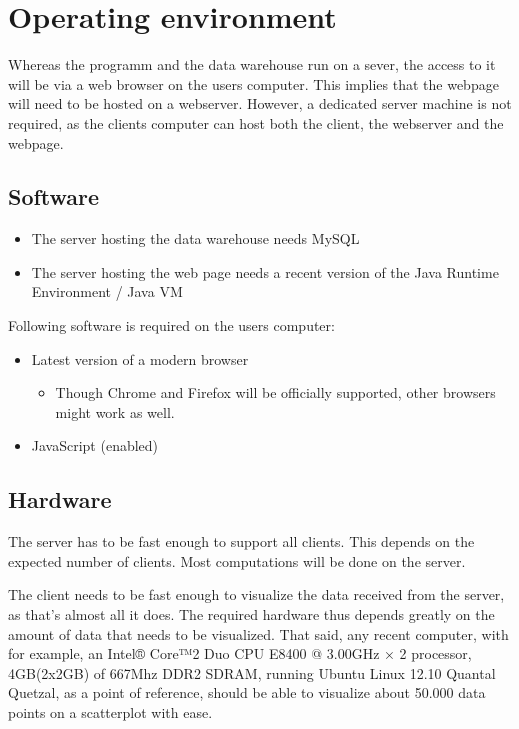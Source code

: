\section{Operating environment}



Whereas the programm and the data warehouse run on a sever,
the access to it will be via a web browser on the users computer. 
This implies that the webpage will need to be hosted on a webserver.
However, a dedicated server machine is not required, as the clients computer can host both the client,
the webserver and the webpage.



\subsection{Software}
\begin{itemize}
  \item The server hosting the data warehouse needs  MySQL %
  
  \item The server hosting the web page needs a 
  recent version of the Java Runtime Environment / Java VM  %
\end{itemize}


Following software is required on the users computer:
\begin{itemize}
  \item Latest version of a modern browser
  \begin{itemize}
    \item Though Chrome and Firefox will be officially supported, other browsers might work as well.
  \end{itemize}
  \item JavaScript (enabled)
\end{itemize}



\subsection{Hardware}

The server has to be fast enough to support all clients. This depends on
the expected number of clients. Most computations will be done on the server.

The client needs to be fast enough to visualize the data received from the server, as that's almost all it does.
The required hardware thus depends greatly on the amount of data that needs to be 
visualized. That said, any recent computer, with for example, 
an Intel® Core™2 Duo CPU E8400 @ 3.00GHz × 2 processor, 
4GB(2x2GB) of 667Mhz DDR2 SDRAM, running Ubuntu Linux 12.10 Quantal Quetzal, 
as a point of reference, should be able to visualize about 50.000 
data points on a scatterplot with ease.


